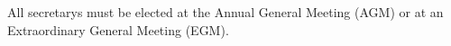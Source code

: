  All secretarys must be elected at the Annual General Meeting (AGM) or at an Extraordinary General Meeting (EGM).\ \\